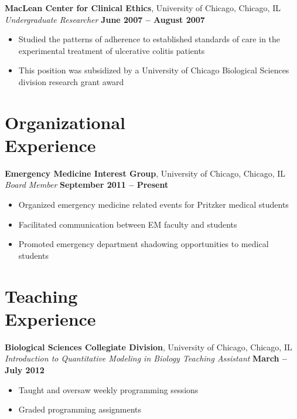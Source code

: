 \documentclass[margin,line]{resume}
\begin{document}
\begin{resume}
    \textbf{MacLean Center for Clinical Ethics}, University of Chicago, Chicago, IL \\\vspace{1mm}%
    \textsl{Undergraduate Researcher} \hfill \textbf{June 2007 -- August 2007}
    \begin{itemize}
    \item Studied the patterns of adherence to established standards of care in the experimental treatment of ulcerative colitis patients
    \item This position was subsidized by a University of Chicago Biological Sciences division research grant award
    \end{itemize}

    \section{\mysidestyle Organizational\\Experience}

    \textbf{Emergency Medicine Interest Group}, University of Chicago, Chicago, IL \\\vspace{1mm}%
    \textsl{Board Member} \hfill \textbf{September 2011 -- Present}\vspace{1mm}%
    \begin{itemize}
    \item Organized emergency medicine related events for Pritzker medical students
    \item Facilitated communication between EM faculty and students
    \item Promoted emergency department shadowing opportunities to medical students
    \end{itemize}

    \section{\mysidestyle Teaching\\Experience}

    \textbf{Biological Sciences Collegiate Division}, University of Chicago, Chicago, IL \\\vspace{1mm}%
    \textsl{Introduction to Quantitative Modeling in Biology Teaching Assistant} \hfill \textbf{March -- July 2012}\vspace{1mm}%
    \begin{itemize}
    \item Taught and oversaw weekly programming sessions
    \item Graded programming assignments
    \end{itemize}


\end{resume}
\end{document}
